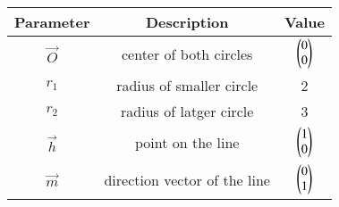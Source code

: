 
\begin{center}
\begin{tabular}{|c|c|c|}
\hline
\textbf{Parameter}	&\textbf{Description}& \textbf{Value}\\ \hline
$\vec{O}$	&center of both circles&	$\begin{pmatrix}0\\0\end{pmatrix}$\\ \hline
$r_1$		&radius of smaller circle&	2\\ \hline
$r_2$		&radius of latger circle&	3\\ \hline
$\vec{h}$	&point on the line&	$\begin{pmatrix}1\\0\end{pmatrix}$\\ \hline
$\vec{m}$	&direction vector of the line&	$\begin{pmatrix}0\\1\end{pmatrix}$\\ \hline
\end{tabular}
\end{center}
